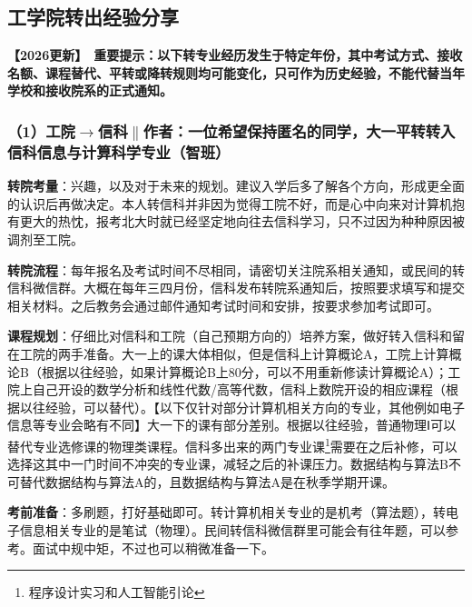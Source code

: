 \documentclass[11pt,oneside]{book}
\newcommand{\updateMark}{\textcolor{chaph}{\textbf{【2026更新】}}\ }
\begin{document}
\subsection{工学院转出经验分享}
\updateMark\textbf{重要提示：以下转专业经历发生于特定年份，其中考试方式、接收名额、课程替代、平转或降转规则均可能变化，只可作为历史经验，不能代替当年学校和接收院系的正式通知。}

\subsubsection{（1）工院$\to$信科$\parallel$作者：一位希望保持匿名的同学，大一平转转入信科信息与计算科学专业（智班）}

\textbf{转院考量}：兴趣，以及对于未来的规划。建议入学后多了解各个方向，形成更全面的认识后再做决定。本人转信科并非因为觉得工院不好，而是心中向来对计算机抱有更大的热忱，报考北大时就已经坚定地向往去信科学习，只不过因为种种原因被调剂至工院。

\vspace{10pt}

\textbf{转院流程}：每年报名及考试时间不尽相同，请密切关注院系相关通知，或民间的转信科微信群。大概在每年三四月份，信科发布转院系通知后，按照要求填写和提交相关材料。之后教务会通过邮件通知考试时间和安排，按要求参加考试即可。

\vspace{10pt}

\textbf{课程规划}：仔细比对信科和工院（自己预期方向的）培养方案，做好转入信科和留在工院的两手准备。大一上的课大体相似，但是信科上计算概论A，工院上计算概论B（根据以往经验，如果计算概论B上80分，可以不用重新修读计算概论A）；工院上自己开设的数学分析和线性代数/高等代数，信科上数院开设的相应课程（根据以往经验，可以替代）。【以下仅针对部分计算机相关方向的专业，其他例如电子信息等专业会略有不同】大一下的课有部分差别。根据以往经验，普通物理Ⅰ可以替代专业选修课的物理类课程。信科多出来的两门专业课\footnote{程序设计实习和人工智能引论}需要在之后补修，可以选择这其中一门时间不冲突的专业课，减轻之后的补课压力。数据结构与算法B不可替代数据结构与算法A的，且数据结构与算法A是在秋季学期开课。

\vspace{10pt}

\textbf{考前准备}：多刷题，打好基础即可。转计算机相关专业的是机考（算法题），转电子信息相关专业的是笔试（物理）。民间转信科微信群里可能会有往年题，可以参考。面试中规中矩，不过也可以稍微准备一下。

\vspace{10pt}
\end{document}
